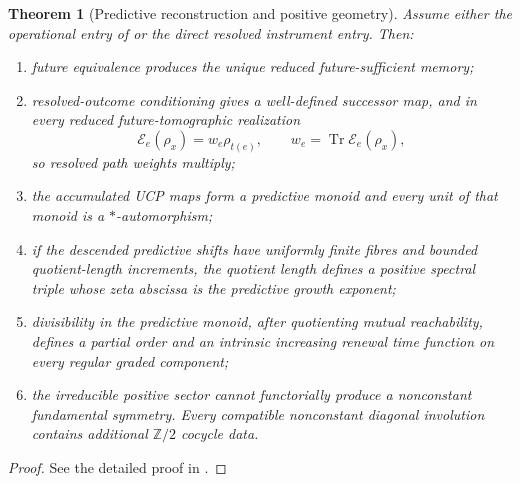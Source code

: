 \documentclass[11pt]{article}
\newtheorem{theorem}{Theorem}[section]
\theoremstyle{definition}
\theoremstyle{remark}
\newcommand{\Tr}{\operatorname{Tr}}
\newcommand{\Ztwo}{\mathbb Z/2}
\begin{document}
\begin{theorem}[Predictive reconstruction and positive geometry]
\label{thm:predictive-geometry}
Assume either the operational entry of  or the
direct resolved instrument entry.  Then:
\begin{enumerate}[label=\textup{(\roman*)},leftmargin=2.7em]
\item future equivalence produces the unique reduced future-sufficient memory;
\item resolved-outcome conditioning gives a well-defined successor map, and in
      every reduced future-tomographic realization
      \[
        \mathcal E_e(\rho_x)=w_e\rho_{t(e)},
        \qquad
        w_e=\Tr\mathcal E_e(\rho_x),
      \]
      so resolved path weights multiply;
\item the accumulated UCP maps form a predictive monoid and every unit of that
      monoid is a $*$-automorphism;
\item if the descended predictive shifts have uniformly finite fibres and
      bounded quotient-length increments, the quotient length defines a
      positive spectral triple whose zeta abscissa is the predictive growth
      exponent;
\item divisibility in the predictive monoid, after quotienting mutual
      reachability, defines a partial order and an intrinsic increasing renewal
      time function on every regular graded component;
\item the irreducible positive sector cannot functorially produce a nonconstant
      fundamental symmetry.  Every compatible nonconstant diagonal involution
      contains additional $\Ztwo$ cocycle data.
\end{enumerate}
\end{theorem}

\begin{proof}
See the detailed proof in .
\end{proof}
\end{document}
